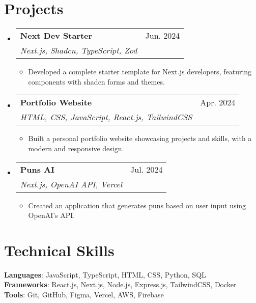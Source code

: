 \documentclass[letterpaper,11pt]{article}
\makeatletter
\newcommand{\resumeSubheading}[4]{
  \vspace{-2pt}\item
    \begin{tabular*}{\textwidth}{l@{\extracolsep{\fill}}r}
      \textbf{#1} & #2 \\
      \textit{\small#3} & \textit{\small #4} \\
    \end{tabular*}\vspace{-7pt}
}
\newcommand{\resumeSubItem}[1]{\item\small{#1 \vspace{-2pt}}}
\newcommand{\resumeSubHeadingListStart}{\begin{itemize}[leftmargin=0.15in, label={}]}
\newcommand{\resumeSubHeadingListEnd}{\end{itemize}}
\newcommand{\resumeItemListStart}{\begin{itemize}}
\newcommand{\resumeItemListEnd}{\end{itemize}\vspace{-5pt}}
\makeatother
\begin{document}
\section{Projects}
    \resumeSubHeadingListStart
      \resumeSubheading
          {Next Dev Starter}{Jun. 2024}{\emph{Next.js, Shadcn, TypeScript, Zod}}{}
          \resumeItemListStart
            \resumeSubItem{Developed a complete starter template for Next.js developers, featuring components with shadcn forms and themes.}
          \resumeItemListEnd
      \resumeSubheading
          {Portfolio Website}{Apr. 2024}{\emph{HTML, CSS, JavaScript, React.js, TailwindCSS}}{}
          \resumeItemListStart
            \resumeSubItem{Built a personal portfolio website showcasing projects and skills, with a modern and responsive design.}
          \resumeItemListEnd
      \resumeSubheading
          {Puns AI}{Jul. 2024}{\emph{Next.js, OpenAI API, Vercel}}{}
          \resumeItemListStart
            \resumeSubItem{Created an application that generates puns based on user input using OpenAI's API.}
          \resumeItemListEnd
    \resumeSubHeadingListEnd

\section{Technical Skills}
 \begin{itemize}[leftmargin=0.15in, label={}]
    \small{\item{
     \textbf{Languages}{: JavaScript, TypeScript, HTML, CSS, Python, SQL} \\
     \textbf{Frameworks}{: React.js, Next.js, Node.js, Express.js, TailwindCSS, Docker} \\
     \textbf{Tools}{: Git, GitHub, Figma, Vercel, AWS, Firebase} \\
    }}
 \end{itemize}

\end{document}
